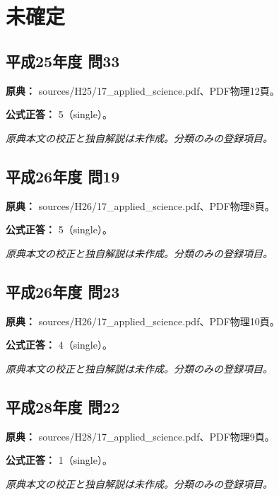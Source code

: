 \section{未確定}

\subsection{平成25年度 問33}
\label{q:h25-reg-applied-33}

\noindent\textbf{原典：} sources/H25/17\_applied\_science.pdf、PDF物理12頁。

\textbf{公式正答：} 5（single）。

\par\textit{原典本文の校正と独自解説は未作成。分類のみの登録項目。}

\subsection{平成26年度 問19}
\label{q:h26-reg-applied-19}

\noindent\textbf{原典：} sources/H26/17\_applied\_science.pdf、PDF物理8頁。

\textbf{公式正答：} 5（single）。

\par\textit{原典本文の校正と独自解説は未作成。分類のみの登録項目。}

\subsection{平成26年度 問23}
\label{q:h26-reg-applied-23}

\noindent\textbf{原典：} sources/H26/17\_applied\_science.pdf、PDF物理10頁。

\textbf{公式正答：} 4（single）。

\par\textit{原典本文の校正と独自解説は未作成。分類のみの登録項目。}

\subsection{平成28年度 問22}
\label{q:h28-reg-applied-22}

\noindent\textbf{原典：} sources/H28/17\_applied\_science.pdf、PDF物理9頁。

\textbf{公式正答：} 1（single）。

\par\textit{原典本文の校正と独自解説は未作成。分類のみの登録項目。}

